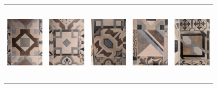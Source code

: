\documentclass{cssheet}
\begin{document}
\begin{figure}[H]
\begin{tabular}{ccccc}
		\includegraphics[height=4cm]{fliesen/fliese16.jpg} &
		\includegraphics[height=4cm]{fliesen/fliese17.jpg} &
		\includegraphics[height=4cm]{fliesen/fliese18.jpg} &
		\includegraphics[height=4cm]{fliesen/fliese19.jpg} &
		\includegraphics[height=4cm]{fliesen/fliese20.jpg} \\
	\end{tabular}
\end{figure}
\end{document}
